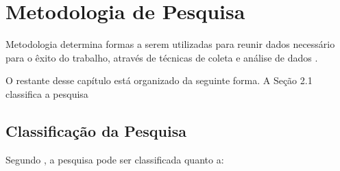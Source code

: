 \chapter{Metodologia de Pesquisa}
\label{cap:metodologiapesquisa}

Metodologia determina formas a serem utilizadas para reunir dados necessário para o êxito do trabalho, através de técnicas de coleta e análise de dados \cite{moresi2003metodologia}. 

O restante desse capítulo está organizado da seguinte forma. A Seção 2.1 classifica a pesquisa 

\section{Classificação da Pesquisa}

Segundo \citeauthor{moresi2003metodologia} \citeyear{moresi2003metodologia}, a pesquisa pode ser classificada quanto a:

